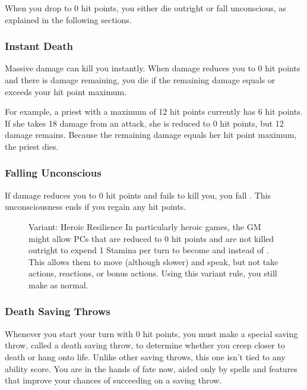 When you drop to 0 hit points, you either die outright or fall unconscious, as explained in the following sections.

\subsubsection{Instant Death}

Massive damage can kill you instantly. When damage reduces you to 0 hit points and there is damage remaining, you die if the remaining damage equals or exceeds your hit point maximum.

For example, a priest with a maximum of 12 hit points currently has 6 hit points. If she takes 18 damage from an attack, she is reduced to 0 hit points, but 12 damage remains. Because the remaining damage equals her hit point maximum, the priest dies.

\subsubsection{Falling Unconscious}

If damage reduces you to 0 hit points and fails to kill you, you fall . This unconsciousness ends if you regain any hit points.

\begin{figure}
	\begin{DndComment}{Variant: Heroic Resilience}
		In particularly heroic games, the GM might allow PCs that are reduced to 0 hit points and are not killed outright to expend 1 Stamina per turn to become  and  instead of . This allows them to move (although slower) and speak, but not take actions, reactions, or bonus actions. Using this variant rule, you still make  as normal.
	\end{DndComment}
\end{figure}

\subsubsection{Death Saving Throws} \label{sec:death-saves}

Whenever you start your turn with 0 hit points, you must make a special saving throw, called a death saving throw, to determine whether you creep closer to death or hang onto life. Unlike other saving throws, this one isn't tied to any ability score. You are in the hands of fate now, aided only by spells and features that improve your chances of succeeding on a saving throw.

